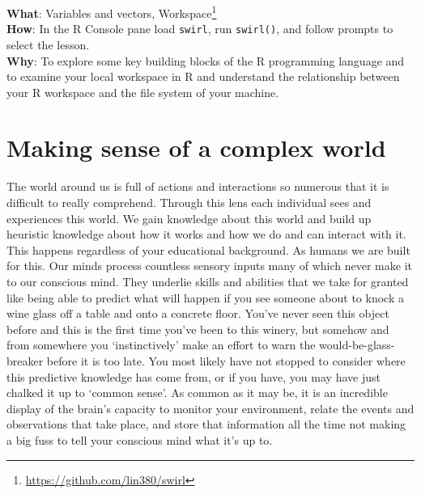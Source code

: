 \documentclass[
  letterpaper,
]{scrbook}
\DeclareRobustCommand{\href}[2]{#2\footnote{\url{#1}}}
\begin{document}
\begin{tcolorbox}[enhanced jigsaw, title=\textcolor{quarto-callout-tip-color}{\faLightbulb}\hspace{0.5em}{Swirl}, breakable, colback=white, colframe=quarto-callout-tip-color-frame, bottomrule=.15mm, left=2mm, bottomtitle=1mm, colbacktitle=quarto-callout-tip-color!10!white, opacityback=0, arc=.35mm, toprule=.15mm, coltitle=black, leftrule=.75mm, opacitybacktitle=0.6, toptitle=1mm, titlerule=0mm, rightrule=.15mm]

\textbf{What}: \href{https://github.com/lin380/swirl}{Variables and
vectors, Workspace}\\
\textbf{How}: In the R Console pane load \texttt{swirl}, run
\texttt{swirl()}, and follow prompts to select the lesson.\\
\textbf{Why}: To explore some key building blocks of the R programming
language and to examine your local workspace in R and understand the
relationship between your R workspace and the file system of your
machine.

\end{tcolorbox}

\hypertarget{text-making-sense-of-a-complex-world}{%
\section{Making sense of a complex
world}\label{text-making-sense-of-a-complex-world}}

The world around us is full of actions and interactions so numerous that
it is difficult to really comprehend. Through this lens each individual
sees and experiences this world. We gain knowledge about this world and
build up heuristic knowledge about how it works and how we do and can
interact with it. This happens regardless of your educational
background. As humans we are built for this. Our minds process countless
sensory inputs many of which never make it to our conscious mind. They
underlie skills and abilities that we take for granted like being able
to predict what will happen if you see someone about to knock a wine
glass off a table and onto a concrete floor. You've never seen this
object before and this is the first time you've been to this winery, but
somehow and from somewhere you `instinctively' make an effort to warn
the would-be-glass-breaker before it is too late. You most likely have
not stopped to consider where this predictive knowledge has come from,
or if you have, you may have just chalked it up to `common sense'. As
common as it may be, it is an incredible display of the brain's capacity
to monitor your environment, relate the events and observations that
take place, and store that information all the time not making a big
fuss to tell your conscious mind what it's up to.
\end{document}
